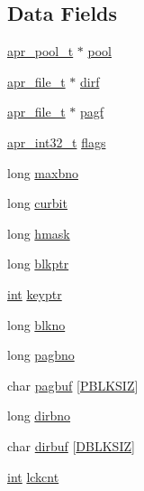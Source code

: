 \subsection*{Data Fields}
\begin{DoxyCompactItemize}
\item 
\hyperlink{structapr__pool__t}{apr\+\_\+pool\+\_\+t} $\ast$ \hyperlink{structapr__sdbm__t_a34ad1ed73a9ed80dc407fc739206c507}{pool}
\item 
\hyperlink{structapr__file__t}{apr\+\_\+file\+\_\+t} $\ast$ \hyperlink{structapr__sdbm__t_a77eb27955ee58d2f4fb524c3c7c3e33c}{dirf}
\item 
\hyperlink{structapr__file__t}{apr\+\_\+file\+\_\+t} $\ast$ \hyperlink{structapr__sdbm__t_a4641e6dc78427953a65e325a3efe1586}{pagf}
\item 
\hyperlink{group__apr__platform_ga21ef1e35fd3ff9be386f3cb20164ff02}{apr\+\_\+int32\+\_\+t} \hyperlink{structapr__sdbm__t_ad89f5c1b03a5ceb684479c076657911f}{flags}
\item 
long \hyperlink{structapr__sdbm__t_a50333e4412f821cc24de74404b5bf633}{maxbno}
\item 
long \hyperlink{structapr__sdbm__t_ae3102fdf2ba9f497283e9f407c8306b6}{curbit}
\item 
long \hyperlink{structapr__sdbm__t_ade5599e60f57f4248540883949ac0316}{hmask}
\item 
long \hyperlink{structapr__sdbm__t_aabe75f218da54bc933e6b408b0bd58c8}{blkptr}
\item 
\hyperlink{pcre_8txt_a42dfa4ff673c82d8efe7144098fbc198}{int} \hyperlink{structapr__sdbm__t_aee21c0ca0f0507c01168e60be0aeb8fa}{keyptr}
\item 
long \hyperlink{structapr__sdbm__t_a6d3b10b2622d58de02d9642a09b63359}{blkno}
\item 
long \hyperlink{structapr__sdbm__t_a45cca39713db088a264b6b2eea518a7f}{pagbno}
\item 
char \hyperlink{structapr__sdbm__t_a026d7cdf20222070455f73415342004f}{pagbuf} \mbox{[}\hyperlink{sdbm__private_8h_ae01c0d5cfeb1c7ac445b60febee0d7a3}{P\+B\+L\+K\+S\+IZ}\mbox{]}
\item 
long \hyperlink{structapr__sdbm__t_aab0f446ab0183d01e25265b0ca80a4cc}{dirbno}
\item 
char \hyperlink{structapr__sdbm__t_a968812c9b4acfb2438c7b89e9a09c6ca}{dirbuf} \mbox{[}\hyperlink{sdbm__private_8h_afdf4a88f105ed7375469db3f9dc15358}{D\+B\+L\+K\+S\+IZ}\mbox{]}
\item 
\hyperlink{pcre_8txt_a42dfa4ff673c82d8efe7144098fbc198}{int} \hyperlink{structapr__sdbm__t_a6f0fbb76a588b7d8cf798bcecf3df1b8}{lckcnt}
\end{DoxyCompactItemize}


